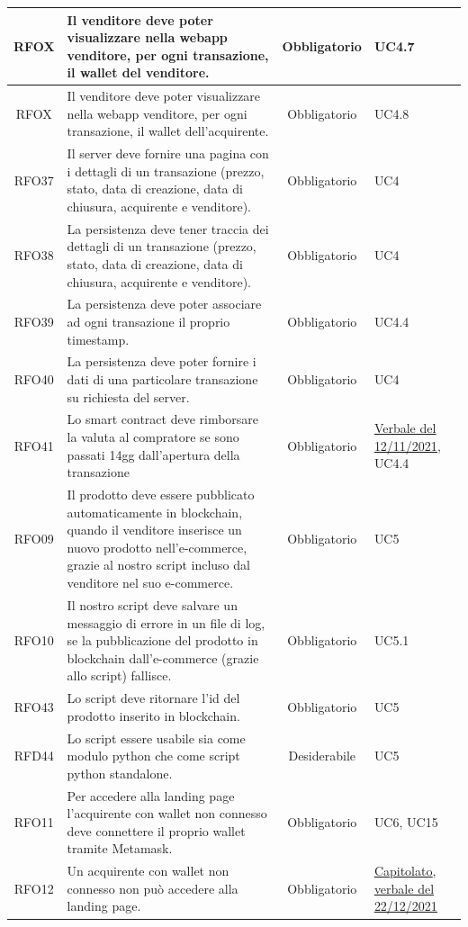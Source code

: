 \documentclass[a4paper, 12pt]{article}
\begin{document}
\begin{longtable}{|c|p{7cm}|c|p{4cm}|}
\hline
RFOX & Il venditore deve poter visualizzare nella webapp venditore, per ogni transazione, il wallet del venditore. & Obbligatorio & UC4.7 \\
\hline
RFOX & Il venditore deve poter visualizzare nella webapp venditore, per ogni transazione, il wallet dell'acquirente. & Obbligatorio & UC4.8 \\
\hline
RFO37 & Il server deve fornire una pagina con i dettagli di un transazione (prezzo, stato, data di creazione, data di chiusura, acquirente e venditore). & Obbligatorio & UC4 \\
\hline
RFO38 & La persistenza deve tener traccia dei dettagli di un transazione (prezzo, stato, data di creazione, data di chiusura, acquirente e venditore). & Obbligatorio & UC4 \\
\hline
RFO39 & La persistenza deve poter associare ad ogni transazione il proprio timestamp. & Obbligatorio & UC4.4 \\
\hline
RFO40 & La persistenza deve poter fornire i dati di una particolare transazione su richiesta del server. & Obbligatorio & UC4 \\
\hline
RFO41 & Lo smart contract deve rimborsare la valuta al compratore se sono passati 14gg dall'apertura della transazione & Obbligatorio & \underline{\href{https://github.com/iota97/WinningSoftwareSolution/blob/main/public/interni/verbali/2021_11_12_I.pdf}{Verbale del 12/11/2021}}, UC4.4 \\
\hline
RFO09 & Il prodotto deve essere pubblicato automaticamente in blockchain, quando il venditore inserisce un nuovo prodotto nell'e-commerce, grazie al nostro script incluso dal venditore nel suo e-commerce. & Obbligatorio & UC5 \\
\hline
RFO10 & Il nostro script deve salvare un messaggio di errore in un file di log, se la pubblicazione del prodotto in blockchain dall'e-commerce (grazie allo script) fallisce. & Obbligatorio & UC5.1 \\
\hline
RFO43 & Lo script deve ritornare l'id del prodotto inserito in blockchain. & Obbligatorio & UC5 \\
\hline
RFD44 & Lo script essere usabile sia come modulo python che come script python standalone. & Desiderabile & UC5 \\
\hline
RFO11 & Per accedere alla landing page l'acquirente con wallet non connesso deve connettere il proprio wallet tramite Metamask. & Obbligatorio & UC6, UC15 \\
\hline
RFO12 & Un acquirente con wallet non connesso non può accedere alla landing page. & Obbligatorio & \underline{\href{https://www.math.unipd.it/~tullio/IS-1/2021/Progetto/C2.pdf}{Capitolato}}, \underline{\href{https://github.com/iota97/WinningSoftwareSolution/blob/main/public/esterni/verbali/2021_12_22_E.pdf}{verbale del 22/12/2021}} \\

\end{longtable}
\end{document}
